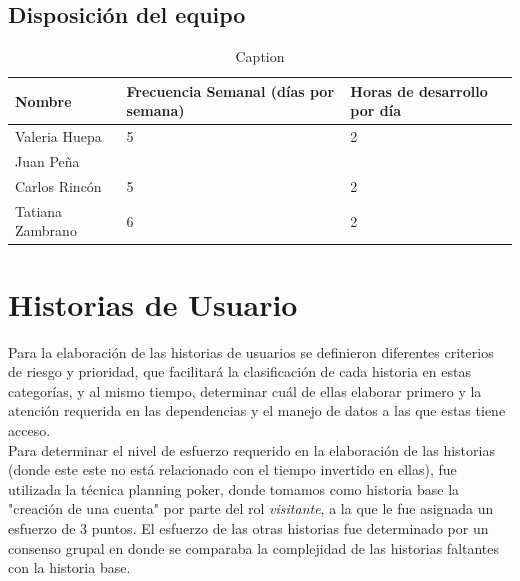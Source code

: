 \documentclass[a4paper,12 pt]{article}
\begin{document}
\subsection{Disposición del equipo}

\begin{table}[H]
    \centering
    \small{
    \begin{tabular}{|M{2cm}|M{4cm}|M{4cm}|}
        \hline
        \textbf{Nombre}    & \textbf{Frecuencia Semanal (días por semana)}   
        &\textbf{Horas de desarrollo por día}\\
        \hline
        Valeria Huepa   &   5   &    2   \\
        \hline
        Juan Peña       &       &       \\
        \hline
        Carlos Rincón   &   5    &  2     \\
        \hline
        Tatiana Zambrano    & 6      &  2     \\
        \hline
    \end{tabular}
    \caption{Caption}
    \label{tab:my_label}}
\end{table}{}

\section{Historias de Usuario}

Para la elaboración de las historias de usuarios se definieron diferentes
criterios de riesgo y prioridad, que facilitará la clasificación de cada
historia en estas categorías, y al mismo tiempo, determinar cuál de ellas
elaborar primero y la atención requerida en las dependencias y el manejo de
datos a las que estas tiene acceso.\\

Para determinar el nivel de esfuerzo requerido en la elaboración de las
historias (donde este este no está relacionado con el tiempo invertido en
ellas), fue utilizada la técnica planning poker, donde tomamos como historia
base la "creación de una cuenta" por parte del rol \textit{visitante}, a la que
le fue asignada un esfuerzo de 3 puntos. El esfuerzo de las otras historias fue
determinado por un consenso grupal en donde se comparaba la complejidad de las
historias faltantes con la historia base.\\
\end{document}
